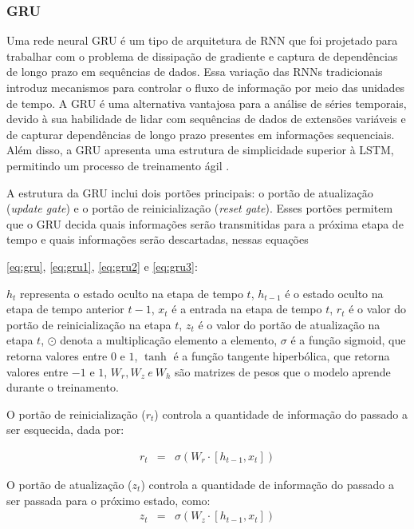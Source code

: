  \subsubsection{GRU}
 
Uma rede neural GRU é um tipo de arquitetura de RNN que foi projetado para trabalhar com o problema de dissipação de gradiente e captura de dependências de longo prazo em sequências de dados. Essa variação das RNNs tradicionais introduz mecanismos para controlar o fluxo de informação por meio das unidades de tempo.
A GRU é uma alternativa vantajosa para a análise de séries temporais, devido à sua habilidade de lidar com sequências de dados de extensões variáveis e de capturar dependências de longo prazo presentes em informações sequenciais. Além disso, a GRU apresenta uma estrutura de simplicidade superior à LSTM, permitindo um processo de treinamento ágil  \cite{mastersthesis53fd58a7}.
 
A estrutura da GRU inclui dois portões principais: o portão de atualização (\textit{update gate}) e o portão de reinicialização (\textit{reset gate}). Esses portões permitem que o GRU decida quais informações serão transmitidas para a próxima etapa de tempo e quais informações serão descartadas, nessas equações 
 
 \eqref{eq:gru}, \eqref{eq:gru1}, \eqref{eq:gru2} e \eqref{eq:gru3}:
 
$ h_t $ representa o estado oculto na etapa de tempo $ t $, $ h_{t-1} $ é o estado oculto na etapa de tempo anterior $ t-1 $, $ x_t $ é a entrada na etapa de tempo $ t $, $ r_t $ é o valor do portão de reinicialização na etapa $ t $, $ z_t $ é o valor do portão de atualização na etapa $ t $, $ \odot $ denota a multiplicação elemento a elemento, $ \sigma $ é a função sigmoid, que retorna valores entre $0$ e $1$, $ \tanh $ é a função tangente hiperbólica, que retorna valores entre $-1$ e $1$, $ W_r, W_z\ e\ W_h $ são matrizes de pesos que o modelo aprende durante o treinamento.
 
O portão de reinicialização ($r_t$) controla a quantidade de informação do passado a ser esquecida, dada por:
 	
 	\begin{eqnarray}
 		r_t &=& \sigma(W_r \cdot [h_{t-1}, x_t])\label{eq:gru}
 	\end{eqnarray} 
 	
O portão de atualização ($z_t$) controla a quantidade de informação do passado a ser passada para o próximo estado, como:
 	\begin{eqnarray}
 		z_t &=& \sigma(W_z \cdot [h_{t-1}, x_t])\label{eq:gru1}
 	\end{eqnarray}
 
